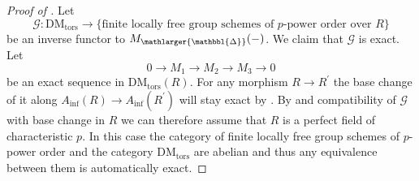 \documentclass{amsart}
\newcommand{\prism}{{\mathlarger{\mathbbl{\Delta}}}}
\theoremstyle{plain}
\theoremstyle{definition}
\renewcommand{\inf}{\mathrm{inf}}
\newcommand{\Z}{\mathbb{Z}}
\begin{document}
\begin{proof}[Proof of ]
Let
$$
\mathcal{G}\colon \mathrm{DM}_{\mathrm{tors}}\to \{\text{finite locally free group schemes of $p$-power order over }R \}
$$
be an inverse functor to $M_\prism(-)$.
We claim that $\mathcal{G}$ is exact.
Let
$$
0\to M_1\to M_2\to M_3\to 0
$$
be an exact sequence in $\mathrm{DM}_{\mathrm{tors}}(R)$. For any morphism $R\to R^\prime$ the base change of it along $A_\inf(R)\to A_\inf(R^\prime)$ will stay exact by .
By \cite[Proposition 1.1]{dejong_finite_locally_free_group_schemes_in_characteristic_p_and_dieudonne_modules} and compatibility of $\mathcal{G}$ with base change in $R$ we can therefore assume that $R$ is a perfect field of characteristic $p$. In this case the category of finite locally free group schemes of $p$-power order and the category $\mathrm{DM}_{\mathrm{tors}}$ are abelian and thus any equivalence between them is automatically exact.

\end{proof}
\end{document}
